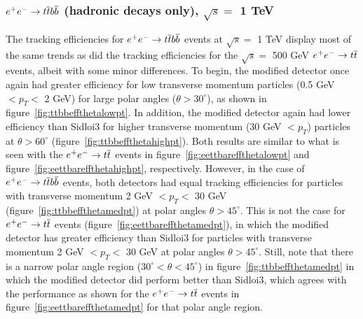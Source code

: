 \subsubsection{$\ee \rightarrow \ttbar \bbbar$ (hadronic decays only), $ \sqrt{s} = $ 1 TeV}
The tracking efficiencies for $\ee \rightarrow \ttbar \bbbar$ events at $ \sqrt{s} = $ 1 TeV
 display most of the same trends as did
the tracking efficiencies for the $ \sqrt{s} = $ 500 GeV $\ee \rightarrow \ttbar$ events, albeit with some minor differences.
To begin, the modified detector once again had greater efficiency for
low transverse momentum particles (0.5 GeV $< p_{T} < $ 2 GeV) for large polar angles ($\theta > 30^{\circ}$),
as shown in figure~\ref{fig:ttbbeffthetalowpt}.
In addition, the modified detector again had lower efficiency than Sidloi3 for 
higher transverse momentum (30 GeV $< p_{T} $) particles at $\theta > 60^{\circ}$ (figure~\ref{fig:ttbbeffthetahighpt}).
Both results are similar to what is seen with the $\ee \rightarrow \ttbar$ events in figure~\ref{fig:eettbareffthetalowpt}
and figure~\ref{fig:eettbareffthetahighpt}, respectively.
However, in the case of $\ee \rightarrow \ttbar \bbbar$ events, both detectors had
equal tracking efficiencies for particles with transverse momentum 2 GeV $< p_{T} < $ 30 GeV (figure~\ref{fig:ttbbeffthetamedpt})
at polar angles $\theta > 45^{\circ}$.
This is not the case for $\ee \rightarrow \ttbar$ events (figure~\ref{fig:eettbareffthetamedpt}), in which
the modified detector has greater efficiency than Sidloi3
for particles with transverse momentum 2 GeV $< p_{T} < $ 30 GeV at polar angles $\theta > 45^{\circ}$.
Still, note that there is a narrow polar angle region ($30^{\circ} < \theta < 45^{\circ}$) in 
figure~\ref{fig:ttbbeffthetamedpt} in which the modified detector
did perform better than Sidloi3, which agrees with the performance as shown for the $\ee \rightarrow \ttbar$ events 
in figure~\ref{fig:eettbareffthetamedpt} for that polar angle region.
